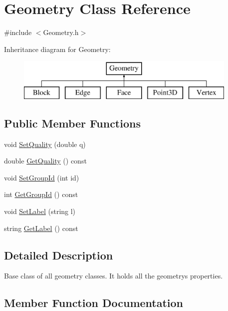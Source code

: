 \hypertarget{class_geometry}{}\section{Geometry Class Reference}
\label{class_geometry}


{\ttfamily \#include $<$Geometry.\+h$>$}

Inheritance diagram for Geometry\+:\begin{figure}[H]
\begin{center}
\leavevmode
\includegraphics[height=2.000000cm]{class_geometry}
\end{center}
\end{figure}
\subsection*{Public Member Functions}
\begin{DoxyCompactItemize}
\item 
void \hyperlink{class_geometry_a79fca7521afb70ed250bc397786f453a}{Set\+Quality} (double q)
\item 
double \hyperlink{class_geometry_a1133070c22222662eb75f92a0dcf1843}{Get\+Quality} () const
\item 
void \hyperlink{class_geometry_a311538e128f84a532d1a63d44843f33d}{Set\+Group\+Id} (int id)
\item 
int \hyperlink{class_geometry_a0edac5bbf074cb985207dbb50e62821a}{Get\+Group\+Id} () const
\item 
void \hyperlink{class_geometry_aae7622e0d7dedc29426a671745837101}{Set\+Label} (string l)
\item 
string \hyperlink{class_geometry_a790bc03456ac9c225a004ebfb9279487}{Get\+Label} () const
\end{DoxyCompactItemize}


\subsection{Detailed Description}
Base class of all geometry classes. It holds all the geometry\textquotesingle{}s properties. 

\subsection{Member Function Documentation}
\hypertarget{class_geometry_a0edac5bbf074cb985207dbb50e62821a}{}\label{class_geometry_a0edac5bbf074cb985207dbb50e62821a} 
